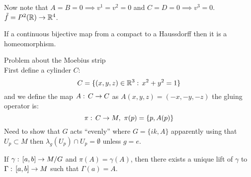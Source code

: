 Now note that $A=B=0\implies v^1 = v^2 =0$ and $C=D=0 \implies v^3=0$.\\
$\tilde f=P^2(\mathbb{R}) \to \mathbb{R}^4$.
\begin{teorema}
If a continuous bijective map from a compact to a Haussdorff then it is a homeomorphism.
\end{teorema}
\begin{remarks}
Problem about the Moebius strip\\
First define a cylinder $C$:
$$C=\{(x,y,z)\in \mathbb{R}^3 :\, x^2+y^2=1 \}$$
and we define the map $A:\, C\to C$ as $A(x,y,z)=(-x,-y,-z)$
the gluing operator is:
$$\pi\from C\to M,\ \pi(p) = \{p,A(p) \}$$
Need to show that $G$ acts ``evenly'' where $G=\{ik,A\}$ apparently using that $U_p\subset M$ then $\lambda_g(U_p) \cap U_p = \emptyset$ unless $g=e$.

\begin{teorema}
If $\gamma:\, [a,b] \to M/G$ and $\pi(A)=\gamma(A)$, then there exists a unique lift of $\gamma$ to $\Gamma:\, [a,b] \to M$ such that $\Gamma(a)=A$.
\end{teorema}
\end{remarks}

